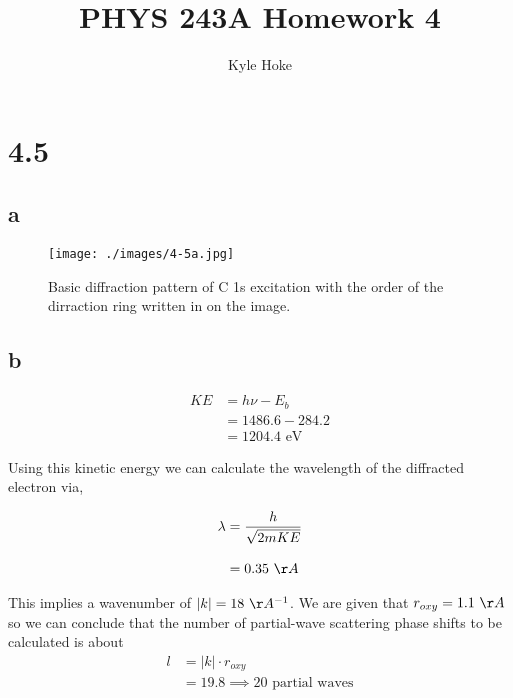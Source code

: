 \documentclass[12pt]{article}
\title{\LARGE PHYS 243A Homework 4}
\author{Kyle Hoke}
\makeatletter
\renewcommand{\maketitle} %
{ \begingroup \vskip 10pt \begin{center} \large {\bf \@title}
	\vskip 10pt \large \@author \hskip 20pt \@date \end{center}
  \vskip 10pt \endgroup \setcounter{footnote}{0} }
\renewcommand{\=}[1]{\stackrel{#1}{=}} %
\theoremstyle{definition}
\theoremstyle{remark}
\makeatother
\begin{document}
\maketitle
\thispagestyle{empty}






\section*{4.5}
\subsection*{a}

\begin{figure}[H]
\centering
\texttt{[image: ./images/4-5a.jpg]}
\caption{Basic diffraction pattern of C 1s excitation with the order of the dirraction ring written in on the image.}
\label{4-5a}
\end{figure}


\subsection*{b}
\begin{align*}
KE &= h\nu - E_b \\[3mm]
	&= 1486.6 - 284.2\\[3mm]
	&= 1204.4 \,\,\text{eV}
\end{align*}

Using this kinetic energy we can calculate the wavelength of the diffracted electron via,

\begin{align*}
\lambda &= \dfrac{h}{\sqrt{2mKE}}\\[3mm]
	&= 0.35\,\,\AA
\end{align*}

This implies a wavenumber of \(|k| = 18\,\,\AA^{-1}\). We are given that $r_{oxy}=1.1\,\,\AA$ so we can conclude 
that the number of partial-wave scattering phase shifts to be calculated is about
\begin{align*}
l &= |k|\cdot r_{oxy}\\[3mm]
	&= 19.8 \implies 20 \,\,\text{partial waves}
\end{align*}
\end{document}
